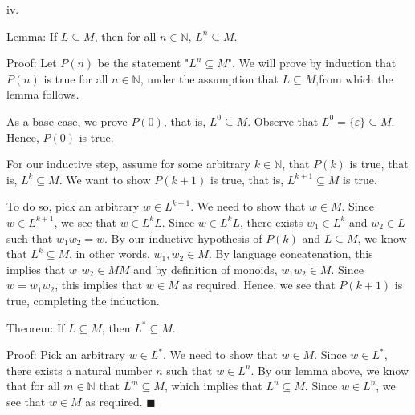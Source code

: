 \documentclass{article}
\renewcommand{\(}{\left(}
\renewcommand{\)}{\right)}
\renewcommand\qedsymbol{$\blacksquare$}
\theoremstyle{plain}
\theoremstyle{plain}
\theoremstyle{definition}
\begin{document}
    iv.
    \begin{shaded}
        Lemma: If $L\subseteq M$, then for all $n\in\mathbb{N}$, $L^{n}\subseteq M$.

        \vspace*{4mm}

        Proof: Let $P(n)$ be the statement "$L^{n}\subseteq M$". We will prove by induction that $P(n)$ is true for all $n\in\mathbb{N}$, under the assumption that $L\subseteq M$,from which the lemma follows.

        \vspace*{4mm}

        As a base case, we prove $P(0)$, that is, $L^{0}\subseteq M$. Observe that $L^{0}=\{\varepsilon\}\subseteq M$. Hence, $P(0)$ is true.

        \vspace*{4mm}

        For our inductive step, assume for some arbitrary $k\in\mathbb{N}$, that $P(k)$ is true, that is, $L^{k}\subseteq M$. We want to show $P(k+1)$ is true, that is, $L^{k+1}\subseteq M$ is true.

        \vspace*{4mm}

        To do so, pick an arbitrary $w\in L^{k+1}$. We need to show that $w\in M$. Since $w\in L^{k+1}$, we see that $w\in L^{k}L$. Since $w\in L^{k}L$, there exists $w_{1}\in L^{k}$ and $w_{2}\in L$ such that $w_{1}w_{2}=w$. By our inductive hypothesis of $P(k)$ and $L\subseteq M$, we know that $L^{k}\subseteq M$, in other words, $w_{1},w_{2}\in M$. By language concatenation, this implies that $w_{1}w_{2}\in MM$ and by definition of monoids, $w_{1}w_{2}\in M$. Since $w=w_{1}w_{2}$, this implies that $w\in M$ as required. Hence, we see that $P(k+1)$ is true, completing the induction.

        \vspace*{4mm}

        Theorem: If $L\subseteq M$, then $L^{*}\subseteq M$.

        \vspace*{4mm}

        Proof: Pick an arbitrary $w\in L^{*}$. We need to show that $w\in M$. Since $w\in L^{*}$, there exists a natural number $n$ such that $w\in L^{n}$. By our lemma above, we know that for all $m\in\mathbb{N}$ that $L^{m}\subseteq M$, which implies that $L^{n}\subseteq M$. Since $w\in L^{n}$, we see that $w\in M$ as required. \qedsymbol
    \end{shaded}
    
\end{document}

